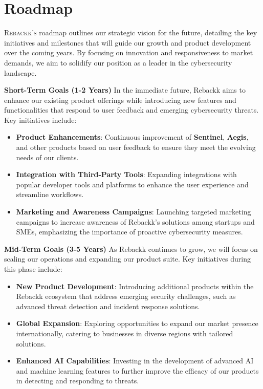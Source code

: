\chapter{Roadmap}

\lettrine{R}{ebackk's} roadmap outlines our strategic vision for the future, detailing the key initiatives and milestones that will guide our growth and product development over the coming years. By focusing on innovation and responsiveness to market demands, we aim to solidify our position as a leader in the cybersecurity landscape.

\textbf{Short-Term Goals (1-2 Years)}  
In the immediate future, Rebackk aims to enhance our existing product offerings while introducing new features and functionalities that respond to user feedback and emerging cybersecurity threats. Key initiatives include:

\begin{itemize}
    \item \textbf{Product Enhancements}: Continuous improvement of \textbf{Sentinel}, \textbf{Aegis}, and other products based on user feedback to ensure they meet the evolving needs of our clients.
    \item \textbf{Integration with Third-Party Tools}: Expanding integrations with popular developer tools and platforms to enhance the user experience and streamline workflows.
    \item \textbf{Marketing and Awareness Campaigns}: Launching targeted marketing campaigns to increase awareness of Rebackk's solutions among startups and SMEs, emphasizing the importance of proactive cybersecurity measures.
\end{itemize}

\textbf{Mid-Term Goals (3-5 Years)}  
As Rebackk continues to grow, we will focus on scaling our operations and expanding our product suite. Key initiatives during this phase include:

\begin{itemize}
    \item \textbf{New Product Development}: Introducing additional products within the Rebackk ecosystem that address emerging security challenges, such as advanced threat detection and incident response solutions.
    \item \textbf{Global Expansion}: Exploring opportunities to expand our market presence internationally, catering to businesses in diverse regions with tailored solutions.
    \item \textbf{Enhanced AI Capabilities}: Investing in the development of advanced AI and machine learning features to further improve the efficacy of our products in detecting and responding to threats.
\end{itemize}

